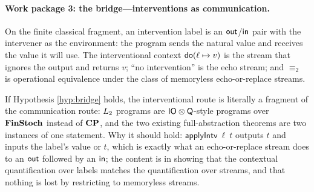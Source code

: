 \paragraph{Work package 3: the bridge---interventions as communication.}
\begin{hyp}\label{hyp:bridge}
On the finite classical fragment, an intervention label is an $\mathsf{out}$/$\mathsf{in}$ pair with the intervener as the environment: the program sends the natural value and receives the value it will use. The interventional context $\mathsf{do}(\ell\mapsto v)$ is the stream that ignores the output and returns $v$; ``no intervention'' is the echo stream; and $\equiv_2$ is operational equivalence under the class of memoryless echo-or-replace streams.
\end{hyp}
\noindent If Hypothesis \ref{hyp:bridge} holds, the interventional route is literally a fragment of the communication route: $L_{2}$ programs are $\mathsf{IO}\otimes\mathsf{Q}$-style programs over $\mathbf{FinStoch}$ instead of $\mathbf{CP}$, and the two existing full-abstraction theorems are two instances of one statement. Why it should hold: $\mathsf{applyIntv}\ \ell\ t$ outputs $t$ and inputs the label's value or $t$, which is exactly what an echo-or-replace stream does to an $\mathsf{out}$ followed by an $\mathsf{in}$; the content is in showing that the contextual quantification over labels matches the quantification over streams, and that nothing is lost by restricting to memoryless streams.
